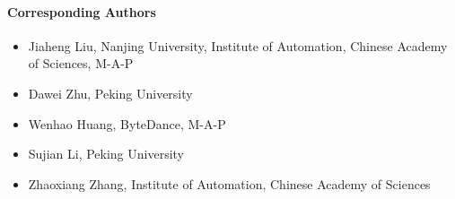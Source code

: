 \documentclass[11pt, a4paper, logo, copyright, nonumbering]{map}
\begin{document}
\paragraph{Corresponding Authors}
\begin{itemize}
    \item Jiaheng Liu, Nanjing University, Institute of Automation, Chinese Academy of Sciences, M-A-P
    \item Dawei Zhu, Peking University
    \item Wenhao Huang, ByteDance, M-A-P
    \item Sujian Li, Peking University
    \item Zhaoxiang Zhang, Institute of Automation, Chinese Academy of Sciences

\end{itemize}


\end{document}
